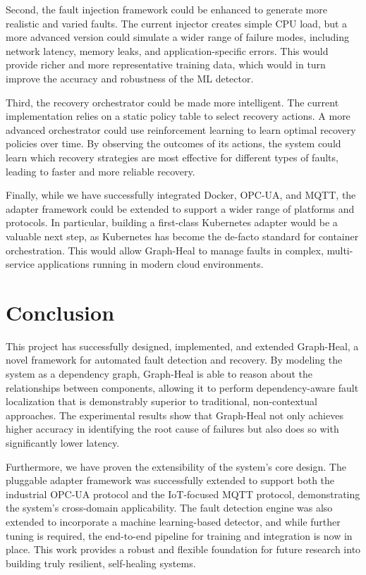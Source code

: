 \documentclass[11pt,conference]{IEEEtran}
\begin{document}
Second, the fault injection framework could be enhanced to generate more realistic and varied faults. The current injector creates simple CPU load, but a more advanced version could simulate a wider range of failure modes, including network latency, memory leaks, and application-specific errors. This would provide richer and more representative training data, which would in turn improve the accuracy and robustness of the ML detector.

Third, the recovery orchestrator could be made more intelligent. The current implementation relies on a static policy table to select recovery actions. A more advanced orchestrator could use reinforcement learning to learn optimal recovery policies over time. By observing the outcomes of its actions, the system could learn which recovery strategies are most effective for different types of faults, leading to faster and more reliable recovery.

Finally, while we have successfully integrated Docker, OPC-UA, and MQTT, the adapter framework could be extended to support a wider range of platforms and protocols. In particular, building a first-class Kubernetes adapter would be a valuable next step, as Kubernetes has become the de-facto standard for container orchestration. This would allow Graph-Heal to manage faults in complex, multi-service applications running in modern cloud environments.


\section{Conclusion}
\label{sec:conclusion}
This project has successfully designed, implemented, and extended Graph-Heal, a novel framework for automated fault detection and recovery. By modeling the system as a dependency graph, Graph-Heal is able to reason about the relationships between components, allowing it to perform dependency-aware fault localization that is demonstrably superior to traditional, non-contextual approaches. The experimental results show that Graph-Heal not only achieves higher accuracy in identifying the root cause of failures but also does so with significantly lower latency.

Furthermore, we have proven the extensibility of the system's core design. The pluggable adapter framework was successfully extended to support both the industrial OPC-UA protocol and the IoT-focused MQTT protocol, demonstrating the system's cross-domain applicability. The fault detection engine was also extended to incorporate a machine learning-based detector, and while further tuning is required, the end-to-end pipeline for training and integration is now in place. This work provides a robust and flexible foundation for future research into building truly resilient, self-healing systems.
\end{document}
